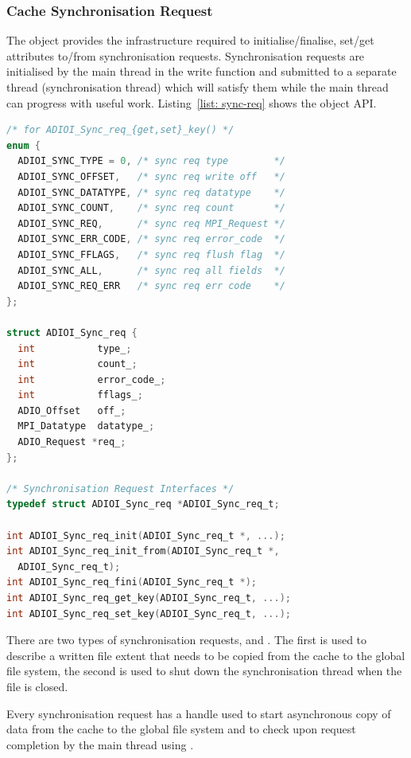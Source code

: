 \subsubsection{Cache Synchronisation Request}
\label{subsubsec: cache-sync-req}
The  object provides the infrastructure required to initialise/finalise, set/get attributes to/from synchronisation requests. Synchronisation requests are initialised by the main thread in the write function and submitted to a separate thread (synchronisation thread) which will satisfy them while the main thread can progress with useful work. Listing~\ref{list: sync-req} shows the object API.

\begin{lstlisting}[language=C, caption=Synchronisation Request API, label={list: sync-req}]
/* for ADIOI_Sync_req_{get,set}_key() */
enum {
  ADIOI_SYNC_TYPE = 0, /* sync req type        */
  ADIOI_SYNC_OFFSET,   /* sync req write off   */
  ADIOI_SYNC_DATATYPE, /* sync req datatype    */
  ADIOI_SYNC_COUNT,    /* sync req count       */
  ADIOI_SYNC_REQ,      /* sync req MPI_Request */
  ADIOI_SYNC_ERR_CODE, /* sync req error_code  */
  ADIOI_SYNC_FFLAGS,   /* sync req flush flag  */
  ADIOI_SYNC_ALL,      /* sync req all fields  */
  ADIOI_SYNC_REQ_ERR   /* sync req err code    */
};

struct ADIOI_Sync_req {
  int           type_;
  int           count_;
  int           error_code_;
  int           fflags_;
  ADIO_Offset   off_;
  MPI_Datatype  datatype_;
  ADIO_Request *req_;
};

/* Synchronisation Request Interfaces */
typedef struct ADIOI_Sync_req *ADIOI_Sync_req_t;

int ADIOI_Sync_req_init(ADIOI_Sync_req_t *, ...);
int ADIOI_Sync_req_init_from(ADIOI_Sync_req_t *, 
  ADIOI_Sync_req_t);
int ADIOI_Sync_req_fini(ADIOI_Sync_req_t *);
int ADIOI_Sync_req_get_key(ADIOI_Sync_req_t, ...);
int ADIOI_Sync_req_set_key(ADIOI_Sync_req_t, ...);
\end{lstlisting}

There are two types of synchronisation requests,  and . The first is used to describe a written file extent that needs to be copied from the cache to the global file system, the second is used to shut down the synchronisation thread when the file is closed.

Every synchronisation request has a  handle used to start asynchronous copy of data from the cache to the global file system and to check upon request completion by the main thread using .

